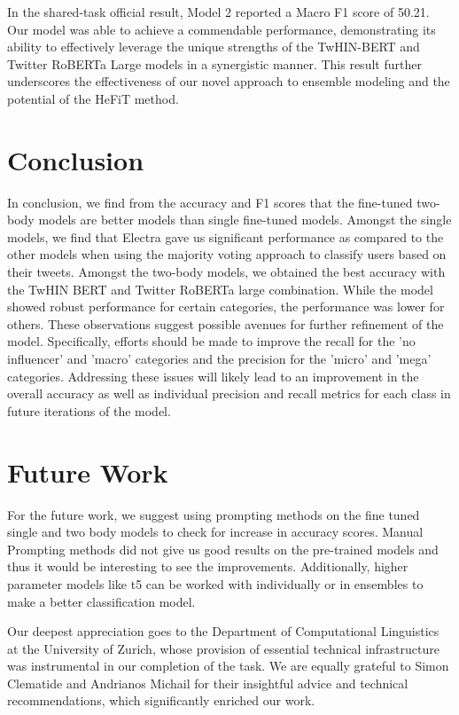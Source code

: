 \documentclass[]{ceurart}
\begin{document}
In the shared-task official result, Model 2 reported a Macro F1 score of 50.21. Our model was able to achieve a commendable performance, demonstrating its ability to effectively leverage the unique strengths of the TwHIN-BERT and Twitter RoBERTa Large models in a synergistic manner. This result further underscores the effectiveness of our novel approach to ensemble modeling and the potential of the HeFiT method.

\section{Conclusion}
In conclusion, we find from the accuracy and F1 scores that the fine-tuned two-body models are better models than single fine-tuned models. Amongst the single models, we find that Electra gave us significant performance as compared to the other models when using the majority voting approach to classify users based on their tweets. Amongst the two-body models, we obtained the best accuracy with the TwHIN BERT and Twitter RoBERTa large combination. While the model showed robust performance for certain categories, the performance was lower for others. These observations suggest possible avenues for further refinement of the model. Specifically, efforts should be made to improve the recall for the 'no influencer' and 'macro' categories and the precision for the 'micro' and 'mega' categories. Addressing these issues will likely lead to an improvement in the overall accuracy as well as individual precision and recall metrics for each class in future iterations of the model.

\section{Future Work}
For the future work, we suggest using prompting methods on the fine tuned single and two body models to check for increase in accuracy scores. Manual Prompting methods did not give us good results on the pre-trained models and thus it would be interesting to see the improvements. Additionally, higher parameter models like t5 can be worked with individually or in ensembles to make a better classification model.

\begin{acknowledgments}
Our deepest appreciation goes to the Department of Computational Linguistics at the University of Zurich, whose provision of essential technical infrastructure was instrumental in our completion of the task. We are equally grateful to Simon Clematide and Andrianos Michail for their insightful advice and technical recommendations, which significantly enriched our work.
\end{acknowledgments}


\end{document}
